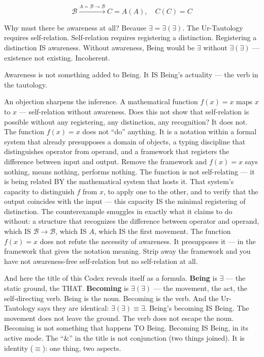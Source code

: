 \documentclass[10pt, openany, oneside]{book}
\begin{document}
\vspace{0.8em}

$$\boxed{\mathcal{B} \xrightarrow{A = \mathcal{B} \to \mathcal{B}} C = A(A), \quad C(C) = C}$$

\noindent Why must there be awareness at all? Because $\exists = \exists(\exists)$. The Ur-Tautology requires self-relation. Self-relation requires registering a distinction. Registering a distinction IS awareness. Without awareness, Being would be $\exists$ without $\exists(\exists)$ --- existence not existing. Incoherent.

Awareness is not something added to Being. It IS Being's actuality --- the verb in the tautology.

An objection sharpens the inference. A mathematical function $f(x) = x$ maps $x$ to $x$ --- self-relation without awareness. Does this not show that self-relation is possible without any registering, any distinction, any recognition? It does not. The function $f(x) = x$ does not ``do'' anything. It is a notation within a formal system that already presupposes a domain of objects, a typing discipline that distinguishes operator from operand, and a framework that registers the difference between input and output. Remove the framework and $f(x) = x$ says nothing, means nothing, performs nothing. The function is not self-relating --- it is being related BY the mathematical system that hosts it. That system's capacity to distinguish $f$ from $x$, to apply one to the other, and to verify that the output coincides with the input --- this capacity IS the minimal registering of distinction. The counterexample smuggles in exactly what it claims to do without: a structure that recognizes the difference between operator and operand, which IS $\mathcal{B} \to \mathcal{B}$, which IS $A$, which IS the first movement. The function $f(x) = x$ does not refute the necessity of awareness. It presupposes it --- in the framework that gives the notation meaning. Strip away the framework and you have not awareness-free self-relation but no self-relation at all.

And here the title of this Codex reveals itself as a formula. \textbf{Being} is $\exists$ --- the static ground, the THAT. \textbf{Becoming} is $\exists(\exists)$ --- the movement, the act, the self-directing verb. Being is the noun. Becoming is the verb. And the Ur-Tautology says they are identical: $\exists(\exists) \equiv \exists$. Being's becoming IS Being. The movement does not leave the ground. The verb does not escape the noun. Becoming is not something that happens TO Being. Becoming IS Being, in its active mode. The ``\&'' in the title is not conjunction (two things joined). It is identity ($\equiv$): one thing, two aspects.
\end{document}

